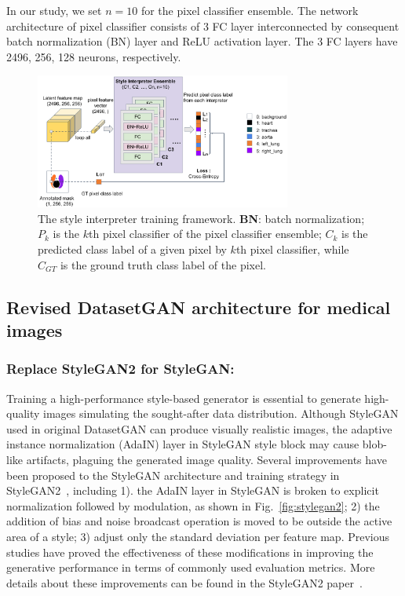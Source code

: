 \documentclass[conference]{IEEEtran}
\begin{document}
In our study, we set $n=10$ for the pixel classifier ensemble. The network architecture of pixel classifier consists of 3 FC layer interconnected by consequent batch normalization (BN) layer and ReLU activation layer. The 3 FC layers have 2496, 256, 128 neurons, respectively. 
\begin{figure}[!ht]
  \centering 
  \includegraphics[width=0.75\textwidth]{./fig/style-interp.png}
  \caption{The style interpreter training framework. \textbf{BN}: batch normalization; \textbf{$P_{k}$} is the $k$th pixel classifier of the pixel classifier ensemble; \textbf{$C_{k}$} is the predicted class label of a given pixel by $k$th pixel classifier, while \textbf{$C_{GT}$} is the ground truth class label of the pixel.}
  \label{fig:interpreter}
\end{figure}

\subsection{Revised DatasetGAN architecture for medical images}
\subsubsection{Replace StyleGAN2 for StyleGAN:}
Training a high-performance style-based generator is essential to generate high-quality images simulating the sought-after data distribution. 
Although StyleGAN used in original DatasetGAN can produce visually realistic images, the adaptive instance normalization (AdaIN) layer in StyleGAN style block may cause blob-like artifacts, plaguing the generated image quality.
Several improvements have been proposed to the StyleGAN architecture and training strategy in StyleGAN2~\cite{Karras2020AnalyzingAI}, including 1). the AdaIN layer in StyleGAN is broken to explicit normalization followed by modulation, as shown in Fig.~\ref{fig:stylegan2}; 2) the addition of bias and noise broadcast operation is moved to
be outside the active area of a style; 3) adjust only the standard deviation per feature map.
Previous studies have proved the effectiveness of these modifications in improving the generative performance in terms of commonly used evaluation metrics. 
More details about these improvements can be found in the StyleGAN2 paper~\cite{Karras2020AnalyzingAI}.
\end{document}
